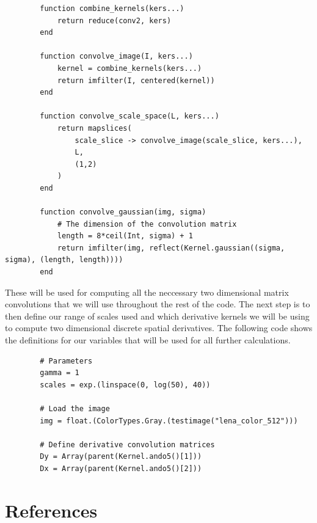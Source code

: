\documentclass{article}
\begin{document}
    \begin{lstlisting}
        function combine_kernels(kers...)
            return reduce(conv2, kers)
        end

        function convolve_image(I, kers...)
            kernel = combine_kernels(kers...)
            return imfilter(I, centered(kernel))
        end

        function convolve_scale_space(L, kers...)
            return mapslices(
                scale_slice -> convolve_image(scale_slice, kers...),
                L,
                (1,2)
            )
        end

        function convolve_gaussian(img, sigma)
            # The dimension of the convolution matrix
            length = 8*ceil(Int, sigma) + 1
            return imfilter(img, reflect(Kernel.gaussian((sigma, sigma), (length, length))))
        end
    \end{lstlisting}

    These will be used for computing all the neccessary two dimensional matrix convolutions that we will use throughout the rest of the code. The next step is to then define our range of scales used and which derivative kernels we will be using to compute two dimensional discrete spatial derivatives. The following code shows the definitions for our variables that will be used for all further calculations. 

    \begin{lstlisting}
        # Parameters
        gamma = 1
        scales = exp.(linspace(0, log(50), 40))

        # Load the image
        img = float.(ColorTypes.Gray.(testimage("lena_color_512")))

        # Define derivative convolution matrices
        Dy = Array(parent(Kernel.ando5()[1]))
        Dx = Array(parent(Kernel.ando5()[2]))
    \end{lstlisting}

\section*{References}
\end{document}

